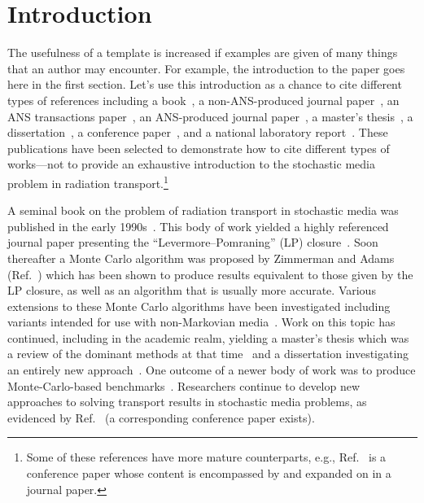 \documentclass{style/nseJournal}
\begin{document}
\section{Introduction}

The usefulness of a template is increased if examples are given of many things that an author may encounter.
For example, the introduction to the paper goes here in the first section.
Let's use this introduction as a chance to cite different types of references including a book~\cite{Pomraning1991book}, a non-ANS-produced journal paper~\cite{AdamsJQSRT1989}, an ANS transactions paper~\cite{ZimmermanANS1991}, an ANS-produced journal paper~\cite{DonovanNSE2003}, a master's thesis~\cite{Vasques2005thesis}, a dissertation~\cite{Fichtl2009dissertation}, a conference paper~\cite{BrantleyMC2009Incident}, and a national laboratory report~\cite{PautzSAND2017AMClosurePres}.
These publications have been selected to demonstrate how to cite different types of works---not to provide an exhaustive introduction to the stochastic media problem in radiation transport.\footnote{Some of these references have more mature counterparts, e.g., Ref.~\cite{BrantleyMC2009Incident} is a conference paper whose content is encompassed by and expanded on in a journal paper.}

A seminal book on the problem of radiation transport in stochastic media was published in the early 1990s~\cite{Pomraning1991book}.
This body of work yielded a highly referenced journal paper presenting the ``Levermore--Pomraning'' (LP) closure~\cite{AdamsJQSRT1989}.
Soon thereafter a Monte Carlo algorithm was proposed by Zimmerman and Adams (Ref.~\cite{ZimmermanANS1991}) which has been shown to produce results equivalent to those given by the LP closure, as well as an algorithm that is usually more accurate.
Various extensions to these Monte Carlo algorithms have been investigated including variants intended for use with non-Markovian media~\cite{DonovanNSE2003}.
Work on this topic has continued, including in the academic realm, yielding a master's thesis which was a review of the dominant methods at that time~\cite{Vasques2005thesis} and a dissertation investigating an entirely new approach~\cite{Fichtl2009dissertation}.
One outcome of a newer body of work was to produce Monte-Carlo-based benchmarks~\cite{BrantleyMC2009Incident}.
Researchers continue to develop new approaches to solving transport results in stochastic media problems, as evidenced by Ref.~\cite{PautzSAND2017AMClosurePres} (a corresponding conference paper exists).
\end{document}
